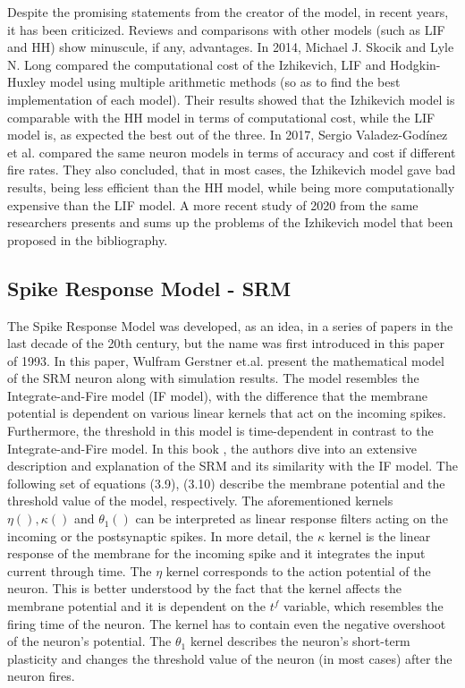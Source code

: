 \documentclass[12pt]{report}
\begin{document}
Despite the promising statements from the creator of the model, in recent years, it has been criticized. Reviews and comparisons with other models (such as LIF and HH) show minuscule, if any, advantages. In 2014, Michael J. Skocik and Lyle N. Long compared the computational cost of the Izhikevich, LIF and Hodgkin-Huxley model using multiple arithmetic methods (so as to find the best implementation of each model)\cite{Skocik2014}. Their results showed that the Izhikevich model is comparable with the HH model in terms of computational cost, while the LIF model is, as expected the best out of the three. In 2017, Sergio Valadez-Godínez et al.\cite{Godinez2017} compared the same neuron models in terms of accuracy and cost if different fire rates. They also concluded, that in most cases, the Izhikevich model gave bad results, being less efficient than the HH model, while being more computationally expensive than the LIF model. A more recent study of 2020 from the same researchers\cite{Valadez-Godinez2020} presents and sums up the problems of the Izhikevich model that been proposed in the bibliography.

\medskip

\subsection{Spike Response Model - SRM}
The Spike Response Model was developed, as an idea, in a series of papers in the last decade of the 20th century, but the name was first introduced in this paper \cite{Gerstner1993} of 1993. In this paper, Wulfram Gerstner et.al. present the mathematical model of the SRM neuron along with simulation results. The model resembles the Integrate-and-Fire model (IF model), with the difference that the membrane potential is dependent on various linear kernels that act on the incoming spikes. Furthermore, the threshold in this model is time-dependent in contrast to the Integrate-and-Fire model. In this book \cite{gerstner2014}, the authors dive into an extensive description and explanation of the SRM and its similarity with the IF model. The following set of equations (3.9), (3.10) describe the membrane potential and the threshold value of the model, respectively. The aforementioned kernels \(\eta(), \kappa()\) and \(\theta_1()\) can be interpreted as linear response filters acting on the incoming or the postsynaptic spikes. In more detail, the \(\kappa\) kernel is the linear response of the membrane for the incoming spike and it integrates the input current through time. The \(\eta\) kernel corresponds to the action potential of the neuron. This is better understood by the fact that the kernel affects the membrane potential and it is dependent on the \(t^f\) variable, which resembles the firing time of the neuron. The kernel has to contain even the negative overshoot of the neuron's potential. The \(\theta_1\) kernel describes the neuron's short-term plasticity and changes the threshold value of the neuron (in most cases) after the neuron fires.
\end{document}
